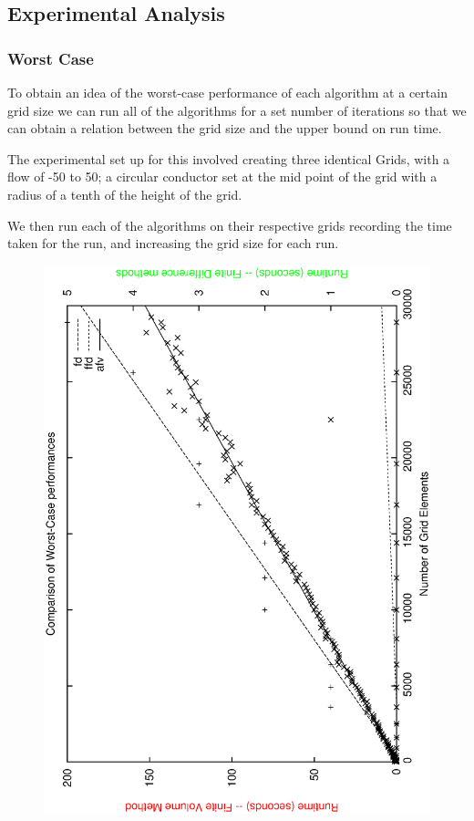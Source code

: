 \documentclass[aps,twocolumn,pre,nofootinbib,10pt]{revtex4-1}
\begin{document}
\subsection{Experimental Analysis}
\subsubsection{Worst Case}

To obtain an idea of the worst-case performance of each algorithm at a certain grid size we can run all of the algorithms for a set number of iterations so that we can obtain a relation between the grid size and the upper bound on run time.

The experimental set up for this involved creating three identical Grids, with a flow of -50 to 50; a circular conductor set at the mid point of the grid with a radius of a tenth of the height of the grid.

We then run each of the algorithms on their respective grids recording the time taken for the run, and increasing the grid size for each run.

\begin{figure}
    \begin{center}
        \includegraphics*[angle=-90,width = \columnwidth ]{comparison_wc.ps}
    \end{center}
\end{figure}
\end{document}
